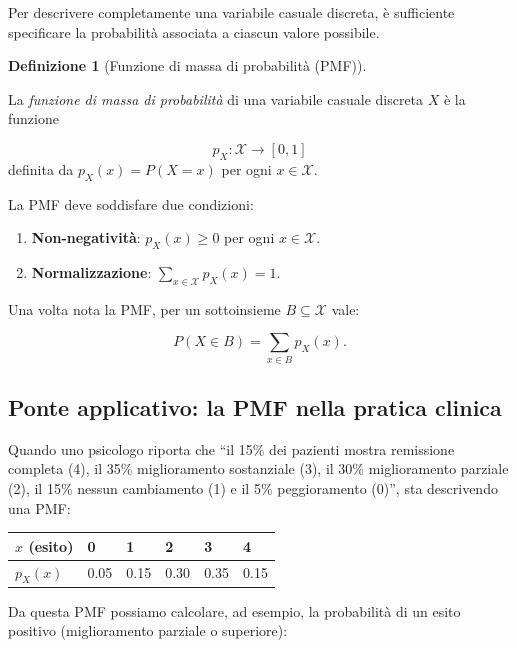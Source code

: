 \documentclass[
  italian,
  letterpaper,
  a4paper,
  11pt,
  open=any]{scrbook}
\newcounter{none} %
\providecommand{\tightlist}{%
  \setlength{\itemsep}{0pt}\setlength{\parskip}{0pt}}
\theoremstyle{plain}
\theoremstyle{definition}
\theoremstyle{definition}
\newtheorem{definition}{Definizione}[chapter]
\theoremstyle{remark}
\begin{document}
Per descrivere completamente una variabile casuale discreta, è
sufficiente specificare la probabilità associata a ciascun valore
possibile.

\begin{definition}[Funzione di massa di probabilità
(PMF)]\protect\hypertarget{def-pmf}{}\label{def-pmf}

La \emph{funzione di massa di probabilità} di una variabile casuale
discreta \(X\) è la funzione

\[
p_X : \mathcal{X} \to [0,1]
\] definita da \(p_X(x) = P(X = x)\) per ogni \(x \in \mathcal{X}\).

\end{definition}

La PMF deve soddisfare due condizioni:

\begin{enumerate}
\def\labelenumi{\arabic{enumi}.}
\tightlist
\item
  \textbf{Non-negatività}: \(p_X(x) \geq 0\) per ogni
  \(x \in \mathcal{X}\).
\item
  \textbf{Normalizzazione}: \(\sum_{x \in \mathcal{X}} p_X(x) = 1\).
\end{enumerate}

Una volta nota la PMF, per un sottoinsieme \(B \subseteq \mathcal{X}\)
vale:

\[
P(X \in B) = \sum_{x \in B} p_X(x).
\]

\subsection{Ponte applicativo: la PMF nella pratica
clinica}\label{ponte-applicativo-la-pmf-nella-pratica-clinica}

Quando uno psicologo riporta che ``il 15\% dei pazienti mostra
remissione completa (4), il 35\% miglioramento sostanziale (3), il 30\%
miglioramento parziale (2), il 15\% nessun cambiamento (1) e il 5\%
peggioramento (0)'', sta descrivendo una PMF:

{\def\LTcaptype{none} %
\begin{longtable}[]{@{}llllll@{}}
\toprule\noalign{}
\(x\) (esito) & 0 & 1 & 2 & 3 & 4 \\
\midrule\noalign{}
\endhead
\bottomrule\noalign{}
\endlastfoot
\(p_X(x)\) & 0.05 & 0.15 & 0.30 & 0.35 & 0.15 \\
\end{longtable}
}

Da questa PMF possiamo calcolare, ad esempio, la probabilità di un esito
positivo (miglioramento parziale o superiore):
\end{document}
